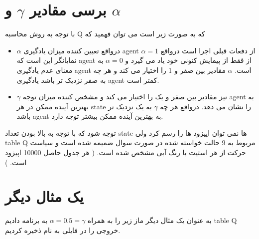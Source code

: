 \documentclass{article}
\begin{document}
	    \section{برسی مقادیر $\gamma$ و $\alpha$}
	        با توجه به روش محاسبه Q که به صورت زیر است می توان فهمید که 
	        \begin{itemize}
	        	\item 	        $\alpha$ درواقع تعیین کننده میزان یادگیری agent از دفعات قبلی اجرا است درواقع 
	        	$\alpha = 1$ نمایانگر این است که agent از فقط از پیمایش کنونی خود یاد می گیرد و $\alpha = 0$ به معنای عدم یادگیری agent است.
	        	$\alpha$ مقادیر بین صفر و 1 را اختیار می کند و هر چه به صفر نزدیک تر باشد یادگیری agent کمتر است.\\
	        	\item $\gamma$ نیز مقادیر بین صفر و یک را اختیار می کند و مشخص کننده میزان توجه agent به بهترین آینده ممکن در هر state را نشان می دهد. درواقع هر چه $\gamma$ به یک نزدیک تر باشد agent به بهترین آینده ممکن بیشتر توجه دارد.
	        \end{itemize}
        توجه شود که با توجه به بالا بودن تعداد state ها نمی توان اپیزود ها را رسم کرد ولی table Q مربوط به 9 حالت خواسته شده در صورت سوال ضمیمه شده است و سیاست حرکت از هر استیت با رنگ آبی مشخص شده است. ( هر جدول حاصل 10000 اپیزود است. )
	\section{یک مثال دیگر}
	    به عنوان یک مثال دیگر ماز زیر را به همراه 
	    $\alpha = 0.5 = \gamma$ به برنامه دادیم table Q خروجی را در فایلی به نام  ذخیره کردیم.
	    
\end{document}
